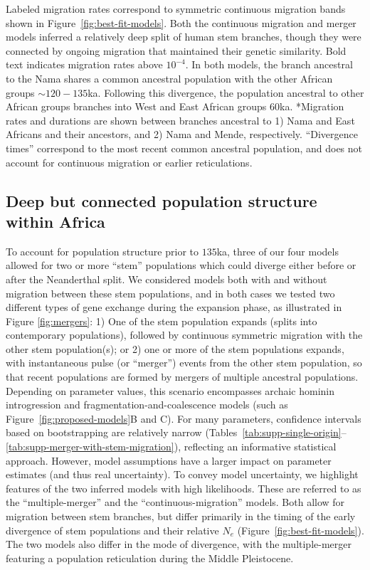 \documentclass[]{article}
\begin{document}
\begin{table}[t!]
{        Labeled migration rates correspond to symmetric continuous migration
        bands shown in Figure~\ref{fig:best-fit-models}. Both the continuous migration and
        merger models inferred a relatively deep split of human stem branches,
        though they were connected by ongoing migration that maintained their
        genetic similarity. Bold text indicates migration rates above $10^{-4}$.
        In both models, the branch ancestral to the Nama shares a common ancestral population
        with the other African groups $\sim120-135$ka. Following this divergence,
        the population ancestral to other African groups branches into West and East African
        groups $60$ka.
        *Migration rates and durations are shown between branches ancestral to 
        1) Nama and East Africans and their ancestors, and
        2) Nama and Mende, respectively.
        ``Divergence times'' correspond to the most recent common ancestral population,
        and does not account for continuous migration or earlier reticulations.
    }
    \label{tab:migration-rates}
\end{table}

\subsection*{Deep but connected population structure within Africa}

To account for population structure prior to $135$ka, three of our four models
allowed for two or more ``stem'' populations which could diverge either before
or after the Neanderthal split. We considered models both with and without
migration between these stem populations, and in both cases we tested two
different types of gene exchange during the expansion phase, as illustrated in
Figure \ref{fig:mergers}: 1) One of the stem population expands (splits into
contemporary populations), followed by continuous symmetric migration with
the other stem population(s); or 2) one or more of the stem
populations expands, with instantaneous pulse (or ``merger'') events from the
other stem population, so that recent populations are formed by mergers of
multiple ancestral populations. Depending on parameter values, this scenario
encompasses archaic hominin introgression and fragmentation-and-coalescence
models (such as Figure~\ref{fig:proposed-models}B and C). For many parameters,
confidence intervals based on bootstrapping are relatively narrow
(Tables~\ref{tab:supp-single-origin}--\ref{tab:supp-merger-with-stem-migration}),
reflecting an informative statistical approach. However, model assumptions have
a larger impact on parameter estimates (and thus real uncertainty).
To convey model uncertainty, we highlight features of the two inferred models
with high likelihoods. These are referred to as the ``multiple-merger'' and the
``continuous-migration'' models. Both allow for migration between stem
branches, but differ primarily in the timing of the early divergence of stem
populations and their relative $N_e$ (Figure~\ref{fig:best-fit-models}). The
two models also differ in the mode of divergence, with the multiple-merger
featuring a population reticulation during the Middle Pleistocene.
\end{document}

